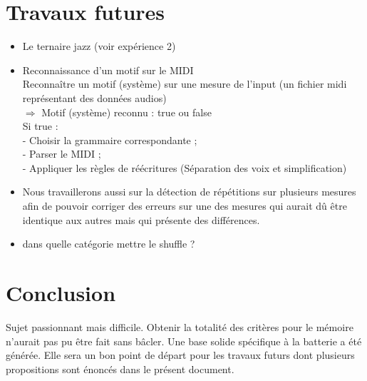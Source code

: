 \section{Travaux futures}
\begin{itemize}
	\item Le ternaire jazz (voir expérience 2)
	\item Reconnaissance d’un motif sur le MIDI\\
	Reconnaître un motif (système) sur une mesure de l’input (un fichier midi représentant des données audios)\\
	$\Rightarrow$ Motif (système) reconnu : true ou false\\
	Si true :\\
	- Choisir la grammaire correspondante ;\\
	- Parser le MIDI ;\\
	- Appliquer les règles de réécritures (Séparation des voix et simplification)
	\item Nous travaillerons aussi sur la détection de répétitions sur plusieurs mesures afin de pouvoir corriger des erreurs sur une des mesures qui aurait dû être identique aux autres mais qui présente des différences.
	\item dans quelle catégorie mettre le shuffle ?
\end{itemize}
\section*{Conclusion}
Sujet passionnant mais difficile. Obtenir la totalité des critères pour le mémoire n’aurait pas pu être fait sans bâcler. Une base solide spécifique à la batterie a été générée. Elle sera un bon point de départ pour les travaux futurs dont plusieurs propositions sont énoncés dans le présent document.